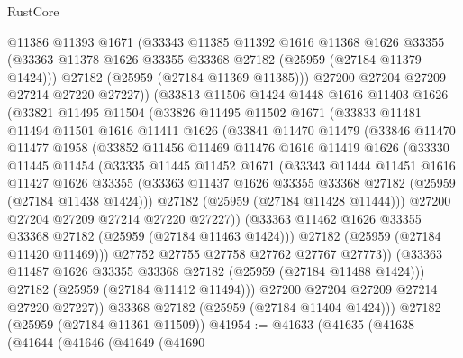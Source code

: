 \begin{lexlean}{RustCore}
\begin{coremodule}
        @11386
        @11393
        @1671
        (@33343
          @11385
          @11392
          @1616
          @11368
          @1626
          @33355
          (@33363 @11378 @1626 @33355 @33368 @27182 (@25959 (@27184 @11379 @1424)))
          @27182
          (@25959 (@27184 @11369 @11385)))
        @27200
        @27204
        @27209
        @27214
        @27220
        @27227))
    (@33813
      @11506
      @1424
      @1448
      @1616
      @11403
      @1626
      (@33821
        @11495
        @11504
        (@33826
          @11495
          @11502
          @1671
          (@33833
            @11481
            @11494
            @11501
            @1616
            @11411
            @1626
            (@33841
              @11470
              @11479
              (@33846
                @11470
                @11477
                @1958
                (@33852
                  @11456
                  @11469
                  @11476
                  @1616
                  @11419
                  @1626
                  (@33330
                    @11445
                    @11454
                    (@33335
                      @11445
                      @11452
                      @1671
                      (@33343
                        @11444
                        @11451
                        @1616
                        @11427
                        @1626
                        @33355
                        (@33363 @11437 @1626 @33355 @33368 @27182 (@25959 (@27184 @11438 @1424)))
                        @27182
                        (@25959 (@27184 @11428 @11444)))
                      @27200
                      @27204
                      @27209
                      @27214
                      @27220
                      @27227))
                  (@33363 @11462 @1626 @33355 @33368 @27182 (@25959 (@27184 @11463 @1424)))
                  @27182
                  (@25959 (@27184 @11420 @11469)))
                @27752
                @27755
                @27758
                @27762
                @27767
                @27773))
            (@33363 @11487 @1626 @33355 @33368 @27182 (@25959 (@27184 @11488 @1424)))
            @27182
            (@25959 (@27184 @11412 @11494)))
          @27200
          @27204
          @27209
          @27214
          @27220
          @27227))
      @33368
      @27182
      (@25959 (@27184 @11404 @1424)))
    @27182
    (@25959 (@27184 @11361 @11509))
@41954 := @41633
    (@41635
      (@41638
        (@41644
          (@41646
            (@41649
              (@41690

\end{coremodule}
\end{lexlean}
